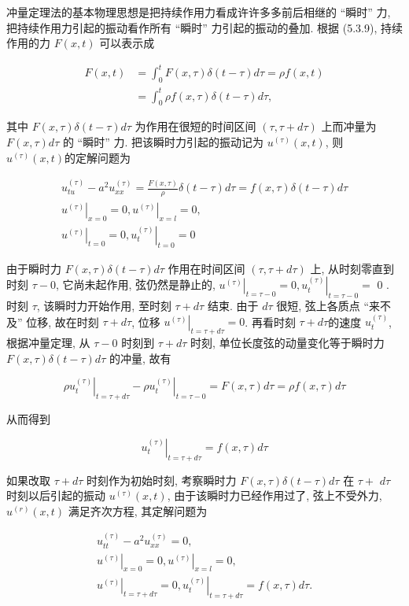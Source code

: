 \begin{solution}
冲量定理法的基本物理思想是把持续作用力看成许许多多前后相继的 “瞬时” 力, 把持续作用力引起的振动看作所有 “瞬时” 力引起的振动的叠加. 根据 (5.3.9), 持续作用的力 $F(x, t)$ 可以表示成

$$
\begin{aligned}
F(x, t) & =\int_{0}^{t} F(x, \tau) \delta(t-\tau) d \tau=\rho f(x, t) \\
& =\int_{0}^{t} \rho f(x, \tau) \delta(t-\tau) d \tau,
\end{aligned}
$$

其中 $F(x, \tau) \delta(t-\tau) d \tau$ 为作用在很短的时间区间 $(\tau, \tau+d \tau)$ 上而冲量为 $F(x, \tau) d \tau$ 的 “瞬时” 力. 把该瞬时力引起的振动记为 $u^{(\tau)}(x, t)$, 则 $u^{(\tau)}(x, t)$的定解问题为

$$
\begin{gathered}
u_{t u}^{(\tau)}-a^{2} u_{x x}^{(\tau)}=\frac{F(x, \tau)}{\rho} \delta(t-\tau) d \tau=f(x, \tau) \delta(t-\tau) d \tau \\
\left.u^{(\tau)}\right|_{x=0}=0,\left.u^{(\tau)}\right|_{x=l}=0, \\
\left.u^{(\tau)}\right|_{t=0}=0,\left.u_{t}^{(\tau)}\right|_{t=0}=0
\end{gathered}
$$

由于瞬时力 $F(x, \tau) \delta(t-\tau) d \tau$ 作用在时间区间 $(\tau, \tau+d \tau)$ 上, 从时刻零直到时刻 $\tau-0$, 它尚未起作用, 弦仍然是静止的, $\left.u^{(\tau)}\right|_{t=\tau-0}=0,\left.u_{t}^{(\tau)}\right|_{t=\tau-0}=$ 0 . 时刻 $\tau$, 该瞬时力开始作用, 至时刻 $\tau+d \tau$ 结束. 由于 $d \tau$ 很短, 弦上各质点 “来不及” 位移, 故在时刻 $\tau+d \tau$, 位移 $\left.u^{(\tau)}\right|_{t=\tau+d \tau}=0$. 再看时刻 $\tau+d \tau$的速度 $u_{t}^{(\tau)}$, 根据冲量定理, 从 $\tau-0$ 时刻到 $\tau+d \tau$ 时刻, 单位长度弦的动量变化等于瞬时力 $F(x, \tau) \delta(t-\tau) d \tau$ 的冲量, 故有

$$
\left.\rho u_{t}^{(\tau)}\right|_{t=\tau+d \tau}-\left.\rho u_{t}^{(\tau)}\right|_{t=\tau-0}=F(x, \tau) d \tau=\rho f(x, \tau) d \tau
$$

从而得到

$$
\left.u_{t}^{(\tau)}\right|_{t=\tau+d \tau}=f(x, \tau) d \tau
$$

如果改取 $\tau+d \tau$ 时刻作为初始时刻, 考察瞬时力 $F(x, \tau) \delta(t-\tau) d \tau$ 在 $\tau+$
$d \tau$ 时刻以后引起的振动 $u^{(\tau)}(x, t)$, 由于该瞬时力已经作用过了, 弦上不受外力, $u^{(r)}(x, t)$ 满足齐次方程, 其定解问题为

$$
\begin{gathered}
u_{t t}^{(\tau)}-a^{2} u_{x x}^{(\tau)}=0, \\
\left.u^{(\tau)}\right|_{x=0}=0,\left.u^{(\tau)}\right|_{x=l}=0, \\
\left.u^{(\tau)}\right|_{t=\tau+d \tau}=0,\left.u_{t}^{(\tau)}\right|_{t=\tau+d \tau}=f(x, \tau) d \tau .
\end{gathered}
$$


\end{solution}
